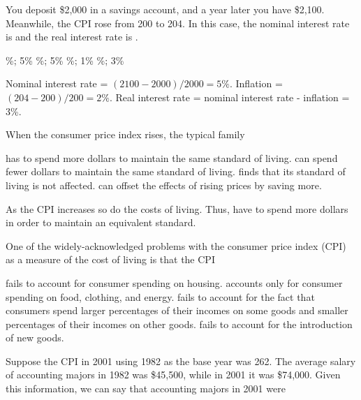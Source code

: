 \documentclass[addpoints,11pt]{exam}
\theoremstyle{definition}
\newcommand{\blank}[0]{\underline{\hspace{3cm}}}
\begin{document}
\begin{questions}
		\question You deposit \$2,000 in a savings account, and a year later you have \$2,100. Meanwhile, the CPI rose from 200 to 204. In this case, the nominal interest rate is \blank and the real interest rate is \blank.
		
			
			\begin{choices}
				\%; 5\% 
				\%; 5\%
				\%; 1\%
				\%; 3\%
			\end{choices}
			
			\begin{solution}
				Nominal interest rate = $(2100-2000)/2000 = 5\%.$ Inflation = $(204-200)/200 = 2\%$. Real interest rate = nominal interest rate - inflation = 3\%.
			\end{solution}
			
			\question When the consumer price index rises, the typical family
			
			\begin{choices}
				\CorrectChoice has to spend more dollars to maintain the same standard of living.
				\choice can spend fewer dollars to maintain the same standard of living.
				\choice finds that its standard of living is not affected.
				\choice can offset the effects of rising prices by saving more.
			\end{choices}
			
		\begin{solution}
			As the CPI increases so do the costs of living. Thus, have to spend more dollars in order to maintain an equivalent standard.
		\end{solution}
				
			\question One of the widely-acknowledged problems with the consumer price index (CPI) as a measure of the cost of living is that the CPI
					
					
					\begin{choices}
						\choice fails to account for consumer spending on housing.
						\choice accounts only for consumer spending on food, clothing, and energy.
						\choice fails to account for the fact that consumers spend larger percentages of their incomes on some goods and smaller percentages of their incomes on other goods.
						\CorrectChoice fails to account for the introduction of new goods.
					\end{choices}
					
			
				
				
			\question Suppose the CPI in 2001 using 1982 as the base year was 262. The average salary of accounting majors in 1982 was \$45,500, while in 2001 it was \$74,000. Given this information, we can say that accounting majors in 2001 were
			

\end{questions}
\end{document}
